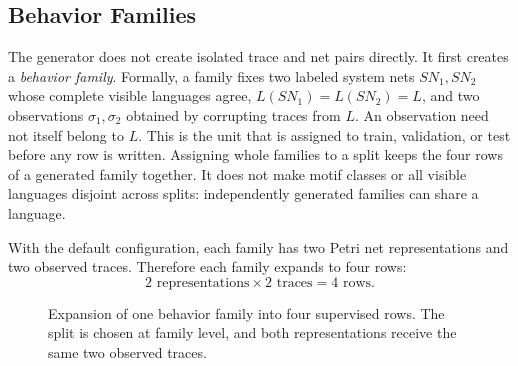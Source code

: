 \documentclass[11pt]{article}
\begin{document}
\subsection{Behavior Families}

The generator does not create isolated trace and net pairs directly. It first
creates a \emph{behavior family}. Formally, a family fixes two labeled system nets $SN_1,SN_2$ whose
complete visible languages agree, $L(SN_1)=L(SN_2)=L$, and two observations
$\sigma_1,\sigma_2$ obtained by corrupting traces from $L$. An observation
need not itself belong to $L$. This is the unit that is assigned to train, validation, or test
before any row is written. Assigning whole families to a split keeps the four rows of a generated
family together. It does not make motif classes or all visible languages
disjoint across splits: independently generated families can share a language.

With the default configuration, each family has two Petri net representations
and two observed traces. Therefore each family expands to four rows:
\[
  2 \text{ representations} \times 2 \text{ traces} = 4 \text{ rows}.
\]

\begin{figure}[htbp]
\centering
{}
\caption{Expansion of one behavior family into four supervised rows. The split
is chosen at family level, and both representations receive the same two
observed traces.}
\label{fig:family-expansion}
\end{figure}
\end{document}
